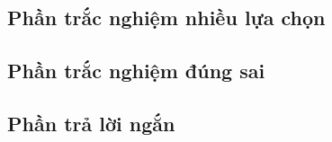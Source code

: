 \documentclass[12pt,a4paper,openany,twoside]{book}
\begin{document}
\subsection{Phần trắc nghiệm nhiều lựa chọn}
\begin{flushleft}
	
\end{flushleft}

\subsection{Phần trắc nghiệm đúng sai}
\begin{flushleft}
	
\end{flushleft}

\subsection{Phần trả lời ngắn}
\begin{flushleft}
	
\end{flushleft}
\end{document}
